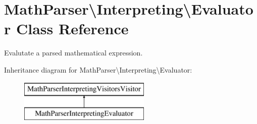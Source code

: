 \hypertarget{classMathParser_1_1Interpreting_1_1Evaluator}{\section{Math\-Parser\textbackslash{}Interpreting\textbackslash{}Evaluator Class Reference}
\label{classMathParser_1_1Interpreting_1_1Evaluator}
}


Evalutate a parsed mathematical expression.  


Inheritance diagram for Math\-Parser\textbackslash{}Interpreting\textbackslash{}Evaluator\-:\begin{figure}[H]
\begin{center}
\leavevmode
\includegraphics[height=2.000000cm]{classMathParser_1_1Interpreting_1_1Evaluator}
\end{center}
\end{figure}
